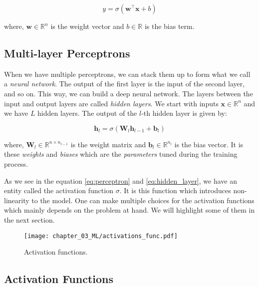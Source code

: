 \begin{equation}
    y = \sigma \left( \textbf{w}^{\top} \textbf{x} + b \right)
    \label{eq:perceptron}
\end{equation}

where, $\textbf{w} \in \mathbb{R}^n$ is the weight vector and $b \in \mathbb{R}$ is the bias term.

\subsection{Multi-layer Perceptrons}


When we have multiple perceptrons, we can stack them up to form what we call a \textit{neural network}. The output of the first layer is the input of the second layer, and so on. This way, we can build a deep neural network. The layers between the input and output layers are called \textit{hidden layers}. We start with inputs $\textbf{x} \in \mathbb{R}^n$ and we have $L$ hidden layers. The output of the $l$-th hidden layer is given by:

\begin{equation}
    \textbf{h}_l = \sigma \left( \textbf{W}_l \textbf{h}_{l-1} + \textbf{b}_l \right)
    \label{eq:hidden_layer}
\end{equation}

where, $\textbf{W}_l \in \mathbb{R}^{n \times n_{l-1}}$ is the weight matrix and $\textbf{b}_l \in \mathbb{R}^{n_l}$ is the bias vector. It is these \textit{weights} and \textit{biases} which are the \textit{parameters} tuned during the training process.

As we see in the equation \ref{eq:perceptron} and \ref{eq:hidden_layer}, we have an entity called the activation function $\sigma$. It is this function which introduces non-linearity to the model. One can make multiple choices for the activation functions which mainly depends on the problem at hand. We will highlight some of them in the next section. 

\begin{figure}[t]
    \centering
    \texttt{[image: chapter\_03\_ML/activations\_func.pdf]}
    \caption{Activation functions.}
    \label{fig:activation_functions}
\end{figure}

\subsection{Activation Functions}

